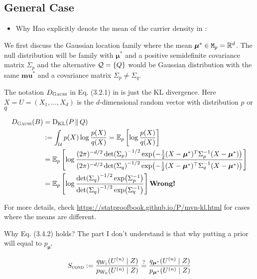 \subsection{General Case}

\begin{itemize}
	\item Why Hao explicitly denote the mean of the carrier density in \cite{grunwaldSafeTesting2024}:
\end{itemize}

We first discuss the Gaussian location family where the mean $\bm{\mu}^*\in\mathtt{M}_p=\mathbb{R}^d$.
The null distribution will be family with $\bm{\mu}^*$ and a positive semidefinite covariance matrix $\Sigma_p$
and the alternative $\mathcal{Q}=\{Q\}$ would be Gaussian distribution with the same $\bm{mu}^*$ and
a covariance matrix $\Sigma_p \not= \Sigma_q$.

The notation $D_{\textsc{Gauss}}$ in Eq. (3.2.1) in \cite{haoEvaluesAnytimevalidInference2025} is
just the KL divergence. Here $X=U=(X_1,\dots,X_d)$ is the $d$-dimensional random vector with
distribution $p$ or $q$

\begin{align*}
	D_{\textsc{Gauss}}(B) & = \KL{P}{Q}                                                                                                             \\
	                      & := \int_{\Uc} p(X) \log \frac{p(X)}{q(X)}
	= \ERWi{p}{\log\frac{p(X)}{q(X)}}                                                                                                               \\
	                      & = \ERWi{p}{\log\frac{(2\pi)^{-d/2} \det(\Sigma_p)^{-1/2}\exp(-\frac{1}{2}(X-\bm{\mu}^*)^T \Sigma_p^{-1}(X-\bm{\mu}^*))}
	{(2\pi)^{-d/2} \det(\Sigma_q)^{-1/2}\exp(-\frac{1}{2}(X-\bm{\mu}^*)^\top \Sigma_q^{-1}(X-\bm{\mu}^*))}}                                         \\
	                      & = \ERWi{p}{\log\frac{\det(\Sigma_q)^{-1/2} \exp(\Sigma_p^{-1})}{\det(\Sigma_q)^{-1/2}\exp(\Sigma_q^{-1})}} \qq{Wrong!}
\end{align*}

For more details, check \url{https://statproofbook.github.io/P/mvn-kl.html} for cases where the means are different.

Why Eq. (3.4.2) holds? The part I don't understand is that
why putting a prior will equal to $p_{\bm{\mu}^*}$

\begin{align*}
	S_{\textsc{cond}} := \frac{q_{W_1}(U^{(n)} \;|\; Z)}{p_{W_0}(U^{(n)} \;|\; Z)}
	\stackrel{?}{=} \frac{q_{\bm{\mu}^*}(U^{(n)} \;|\; Z)}{p_{\bm{\mu}^*}(U^{(n)} \;|\; Z)}
\end{align*}

